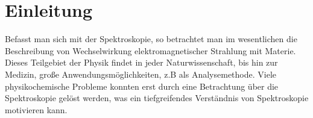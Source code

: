 %

%

\section{Einleitung}
Befasst man sich mit der Spektroskopie, so betrachtet man im wesentlichen die Beschreibung von Wechselwirkung elektromagnetischer Strahlung mit Materie. Dieses Teilgebiet der Physik findet in jeder Naturwissenschaft, bis hin zur Medizin, große Anwendungsmöglichkeiten, z.B als Analysemethode. Viele physikochemische Probleme konnten erst durch eine Betrachtung über die Spektroskopie gelöst werden, was ein tiefgreifendes Verständnis von Spektroskopie motivieren kann.




%






